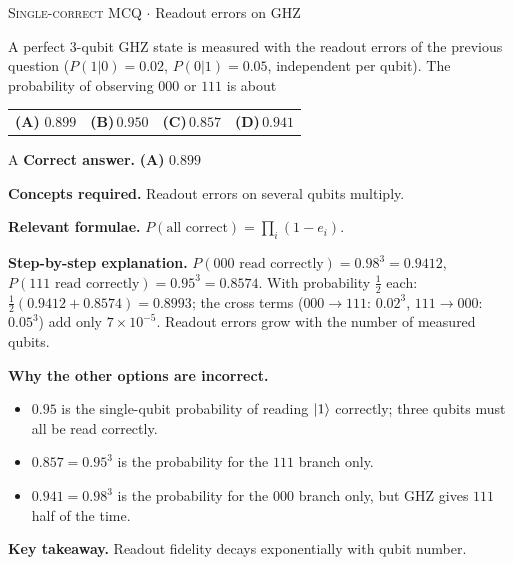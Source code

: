 \documentclass[11pt,a4paper]{article}
\newcommand{\optlabel}[1]{\textbf{(#1)}}
\newcommand{\correctlabel}[1]{\textcolor{okgreen}{\textbf{(#1)}\,\ding{51}}}
\newenvironment{qitem}[1]{\begin{list}{}{\setlength{\leftmargin}{3.3em}\setlength{\labelwidth}{3.1em}%
  \setlength{\labelsep}{0.2em}\setlength{\topsep}{3pt}\setlength{\parsep}{3pt}}\item[\textbf{Q.#1}\hfill]}{\end{list}}
\newcommand{\qsep}{\par\vspace{2pt}{\color{black!15}\hrule}\vspace{4pt}}
\newcommand{\qmeta}[2]{{\footnotesize\color{black!60}\textsc{#1} \;$\cdot$\; #2}\par}
\begin{document}
\begin{qitem}{31}
\qmeta{Single-correct MCQ}{Readout errors on GHZ}
A perfect 3-qubit GHZ state is measured with the readout errors of the previous question ($P(1|0) = 0.02$, $P(0|1) = 0.05$, independent per qubit).
The probability of observing $000$ or $111$ is about
\par\smallskip\noindent\begin{tabularx}{\linewidth}{@{}*{4}{L}@{}}
\correctlabel{A}\,$0.899$ & \optlabel{B}\,$0.950$ & \optlabel{C}\,$0.857$ & \optlabel{D}\,$0.941$
\end{tabularx}
\end{qitem}
\begin{solbox}{A}
\textbf{\color{brand}Correct answer.} \textcolor{okgreen}{\textbf{(A)}} $0.899$

\textbf{\color{brand}Concepts required.} Readout errors on several qubits multiply.

\textbf{\color{brand}Relevant formulae.} $P(\text{all correct}) = \prod_i(1 - e_i)$.

\textbf{\color{brand}Step-by-step explanation.} $P(000\text{ read correctly}) = 0.98^3 = 0.9412$, $P(111\text{ read correctly}) = 0.95^3 = 0.8574$. With probability $\frac12$ each:
$\frac12(0.9412 + 0.8574) = 0.8993$; the cross terms ($000 \to 111$: $0.02^3$, $111 \to 000$: $0.05^3$) add only $7\times10^{-5}$. Readout
errors grow with the number of measured qubits.

\textbf{\color{brand}Why the other options are incorrect.}
\begin{itemize}[leftmargin=2.4em, itemsep=1pt, topsep=2pt]
\item[\textbf{(B)}] $0.95$ is the single-qubit probability of reading $\ket1$ correctly; three qubits must all be read correctly.
\item[\textbf{(C)}] $0.857 = 0.95^3$ is the probability for the $111$ branch only.
\item[\textbf{(D)}] $0.941 = 0.98^3$ is the probability for the $000$ branch only, but GHZ gives $111$ half of the time.
\end{itemize}
\textbf{\color{brand}Key takeaway.} Readout fidelity decays exponentially with qubit number.
\end{solbox}
\qsep
\end{document}
